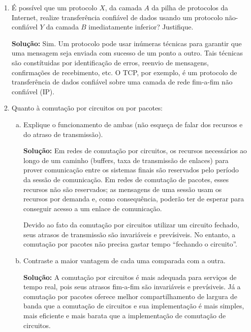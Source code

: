 \documentclass{article}
\begin{document}
\begin{enumerate}
\item É possível que um protocolo $X$, da camada $A$ da pilha de protocolos da Internet, realize transferência confiável de dados usando um protocolo não-confiável $Y$ da camada $B$ imediatamente inferior? Justifique.
\begin{addmargin}[0.5in]{0.5in}
\par \textbf{Solução:}
Sim. Um protocolo pode usar inúmeras técnicas para garantir que uma mensagem seja enviada com sucesso de um ponto a outro. Tais técnicas são constítuidas por identificação de erros, reenvio de mensagens, confirmações de recebimento, etc. O TCP, por exemplo, é um protocolo de transferência de dados confiável sobre uma camada de rede fim-a-fim não confiável (IP).
\end{addmargin}

\item Quanto à comutação por circuitos ou por pacotes:
\begin{enumerate}[a)]
\item Explique o funcionamento de ambas (não esqueça de falar dos recursos e do atraso de transmissão).
\begin{addmargin}[0.5in]{0.5in}
\par \textbf{Solução:}
Em redes de comutação por circuitos, os recursos necessários ao longo de um caminho (buffers, taxa de transmissão de enlaces) para prover comunicação entre os sistemas finais são reservados pelo período da sessão de comunicação. Em redes de comutação de pacotes, esses recursos não são reservados; as mensagens de uma sessão usam os recursos por demanda e, como consequência, poderão ter de esperar para conseguir acesso a um enlace de comunicação.
\par Devido ao fato da comutação por circuitos utilizar um circuito fechado, seus atrasos de transmissão são invariáveis e prevísiveis. No entanto, a comutação por pacotes não precisa gastar tempo ``fechando o circuito''.
\end{addmargin}

\item Contraste a maior vantagem de cada uma comparada com a outra.
\begin{addmargin}[0.5in]{0.5in}
\par \textbf{Solução:}
A comutação por circuitos é mais adequada para serviços de tempo real, pois seus atrasos fim-a-fim são invariáveis e prevísiveis. Já a comutação por pacotes oferece melhor compartilhamento de largura de banda que a comutação de circuitos e sua implementação é mais simples, mais eficiente e mais barata que a implementação de comutação de circuitos.
\end{addmargin}


\end{enumerate}
\end{enumerate}
\end{document}
